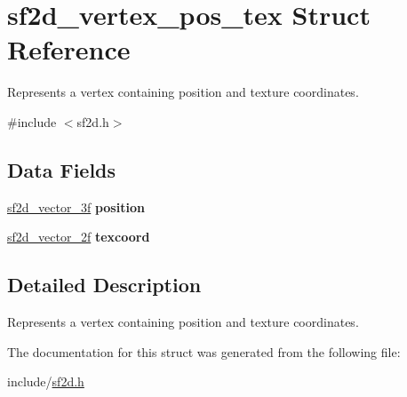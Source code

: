 \hypertarget{structsf2d__vertex__pos__tex}{\section{sf2d\-\_\-vertex\-\_\-pos\-\_\-tex Struct Reference}
\label{structsf2d__vertex__pos__tex}
}


Represents a vertex containing position and texture coordinates.  




{\ttfamily \#include $<$sf2d.\-h$>$}

\subsection*{Data Fields}
\begin{DoxyCompactItemize}
\item 
\hypertarget{structsf2d__vertex__pos__tex_ae5e85779f0eb3db4b2c26fe77be8cf41}{\hyperlink{structsf2d__vector__3f}{sf2d\-\_\-vector\-\_\-3f} {\bfseries position}}\label{structsf2d__vertex__pos__tex_ae5e85779f0eb3db4b2c26fe77be8cf41}

\item 
\hypertarget{structsf2d__vertex__pos__tex_a72fcf7753d1977b813b6e5336c27fce6}{\hyperlink{structsf2d__vector__2f}{sf2d\-\_\-vector\-\_\-2f} {\bfseries texcoord}}\label{structsf2d__vertex__pos__tex_a72fcf7753d1977b813b6e5336c27fce6}

\end{DoxyCompactItemize}


\subsection{Detailed Description}
Represents a vertex containing position and texture coordinates. 

The documentation for this struct was generated from the following file\-:\begin{DoxyCompactItemize}
\item 
include/\hyperlink{sf2d_8h}{sf2d.\-h}\end{DoxyCompactItemize}
